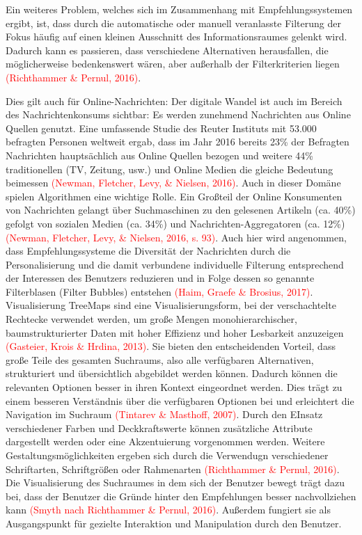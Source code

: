 \documentclass[ngerman, a4paper, abstract=false, twoside=false, parskip=half, DIV=12, bibtotoc]{scrartcl}
\begin{document}
Ein weiteres Problem, welches sich im Zusammenhang mit Empfehlungssystemen ergibt, ist, dass durch die automatische oder manuell veranlasste Filterung der Fokus häufig auf einen kleinen Ausschnitt des Informationsraumes gelenkt wird. Dadurch kann es passieren, dass verschiedene Alternativen herausfallen, die möglicherweise bedenkenswert wären, aber außerhalb der Filterkriterien liegen \textcolor{red}{(Richthammer & Pernul, 2016)}. 

Dies gilt auch für Online-Nachrichten: Der digitale Wandel ist auch im Bereich des Nachrichtenkonsums sichtbar: Es werden zunehmend Nachrichten aus Online Quellen genutzt. Eine umfassende Studie des Reuter Instituts mit 53.000 befragten Personen weltweit ergab, dass im Jahr 2016 bereits 23\% der Befragten Nachrichten hauptsächlich aus Online Quellen bezogen und weitere 44\% traditionellen (TV, Zeitung, usw.) und Online Medien die gleiche Bedeutung beimessen \textcolor{red}{(Newman, Fletcher, Levy, & Nielsen, 2016)}. Auch in dieser Domäne spielen Algorithmen eine wichtige Rolle. Ein Großteil der Online Konsumenten von Nachrichten gelangt über Suchmaschinen zu den gelesenen Artikeln (ca. 40\%) gefolgt von sozialen Medien (ca. 34\%) und Nachrichten-Aggregatoren (ca. 12\%) \textcolor{red}{(Newman, Fletcher, Levy, & Nielsen, 2016, s. 93)}. Auch hier wird angenommen, dass Empfehlungssysteme die Diversität der Nachrichten durch die Personalisierung und die damit verbundene individuelle Filterung entsprechend der Interessen des Benutzers reduzieren und in Folge dessen so genannte Filterblasen (Filter Bubbles) entstehen \textcolor{red}{(Haim, Graefe \& Brosius, 2017)}.  
Visualisierung
TreeMaps sind eine Visualisierungsform, bei der verschachtelte Rechtecke verwendet werden, um große Mengen monohierarchischer, baumstrukturierter Daten mit hoher Effizienz und hoher Lesbarkeit anzuzeigen \textcolor{red}{(Gasteier, Krois \& Hrdina, 2013)}.
Sie bieten den entscheidenden Vorteil, dass große Teile des gesamten Suchraums, also alle verfügbaren Alternativen, strukturiert und übersichtlich abgebildet werden können. Dadurch können die relevanten Optionen besser in ihren Kontext eingeordnet werden. Dies trägt zu einem besseren Verständnis über die verfügbaren Optionen bei und erleichtert die Navigation im Suchraum \textcolor{red}{(Tintarev \& Masthoff, 2007)}. Durch den EInsatz verschiedener Farben und Deckkraftswerte können zusätzliche Attribute dargestellt werden oder eine Akzentuierung vorgenommen werden. Weitere Gestaltungsmöglichkeiten ergeben sich durch die Verwendugn verschiedener Schriftarten, Schriftgrößen oder Rahmenarten \textcolor{red}{(Richthammer \& Pernul, 2016)}.
Die Visualisierung des Suchraumes in dem sich der Benutzer bewegt trägt dazu bei, dass der Benutzer die Gründe hinter den Empfehlungen besser nachvollziehen kann \textcolor{red}{(Smyth nach Richthammer \& Pernul, 2016)}. Außerdem fungiert sie als Ausgangspunkt für gezielte Interaktion und Manipulation durch den Benutzer. 
\end{document}
